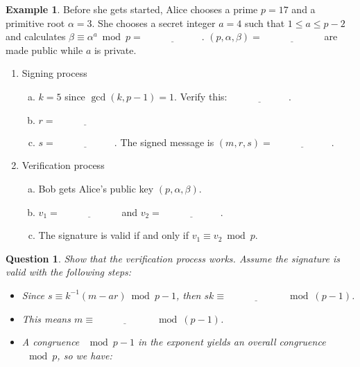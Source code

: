 \documentclass[12pt]{amsart}
\theoremstyle{plain}
\newtheorem{quest}{Question}
\theoremstyle{definition}
\newtheorem*{ex}{Example}
\theoremstyle{remark}
\begin{document}
\newpage \begin{ex}
Before she gets started, Alice chooses a prime $p = 17$ and a primitive root $\alpha = 3$.  She chooses a secret integer $a = 4$ such that $1 \leq a \leq p-2$ and calculates $\beta \equiv \alpha^a \bmod p = \underline{\hspace{1in}}$.  $(p, \alpha, \beta) = \underline{\hspace{1in}}$ are made public while $a$ is private.
\begin{enumerate}[1.]
	\item Signing process
		\begin{enumerate}[a.]
			\item $k = 5$ since $\gcd(k,p-1) = 1$.  Verify this: $\underline{\hspace{1in}}$.
			\item $r = \underline{\hspace{1in}}$
			\item $s = \underline{\hspace{1in}}$.  The signed message is $(m,r,s) = \underline{\hspace{1in}}$.
		\end{enumerate}
	\item Verification process
	\begin{enumerate}[a.]
		\item Bob gets Alice's public key $(p, \alpha, \beta)$.
		\item $v_1 = \underline{\hspace{1in}}$ and $v_2 = \underline{\hspace{1in}}$.
		\item The signature is valid if and only if $v_1 \equiv v_2 \bmod p$.
	\end{enumerate}
\end{enumerate}
\end{ex}

\begin{quest}
Show that the verification process works.  Assume the signature is valid with the following steps:\\
\begin{itemize}
	\item Since $s \equiv k^{-1}(m-ar) \bmod p-1$, then $sk \equiv \underline{\hspace{1in}} \bmod (p-1)$.\\
	\item This means $m \equiv  \underline{\hspace{1in}} \bmod (p-1)$.\\
	\item A congruence $\mod p-1$ in the exponent yields an overall congruence $\mod p$, so we have:
\end{itemize}
\end{quest}
\end{document}
